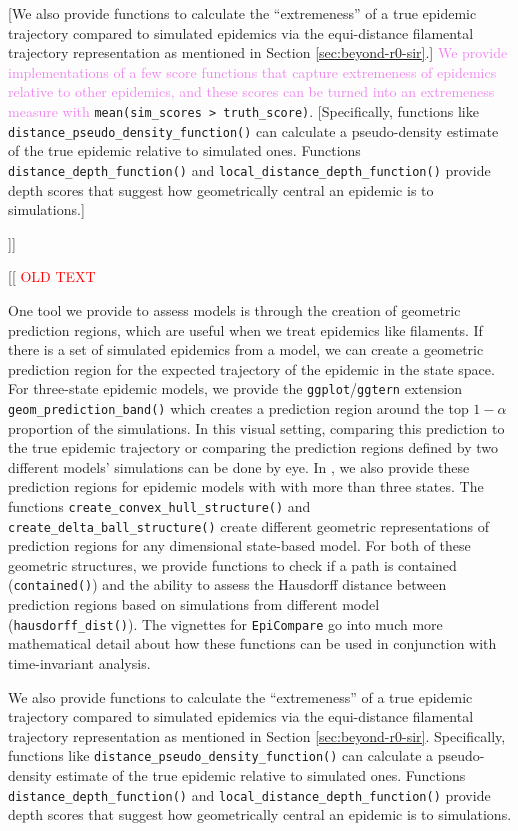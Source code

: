 \documentclass[
  shortnames]{jss}
\begin{document}
{[}We also provide functions to calculate the ``extremeness'' of a true
epidemic trajectory compared to simulated epidemics via the
equi-distance filamental trajectory representation as mentioned in
Section \ref{sec:beyond-r0-sir}.{]}
\textcolor{violet}{We provide implementations of a few score functions that capture extremeness of epidemics relative to other epidemics, and these scores can be turned into an extremeness measure with}
\texttt{mean(sim\_scores\ \textgreater{}\ truth\_score)}.
{[}Specifically, functions like
\texttt{distance\_pseudo\_density\_function()} can calculate a
pseudo-density estimate of the true epidemic relative to simulated ones.
Functions \texttt{distance\_depth\_function()} and
\texttt{local\_distance\_depth\_function()} provide depth scores that
suggest how geometrically central an epidemic is to simulations.{]}

{]}{]}

{[}{[}\textcolor{red}{ OLD TEXT}

One tool we provide to assess models is through the creation of
geometric prediction regions, which are useful when we treat epidemics
like filaments. If there is a set of simulated epidemics from a model,
we can create a geometric prediction region for the expected trajectory
of the epidemic in the state space. For three-state epidemic models, we
provide the \texttt{ggplot}/\texttt{ggtern} extension
\texttt{geom\_prediction\_band()} which creates a prediction region
around the top \(1-\alpha\) proportion of the simulations. In this
visual setting, comparing this prediction to the true epidemic
trajectory or comparing the prediction regions defined by two different
models' simulations can be done by eye. In , we also
provide these prediction regions for epidemic models with with more than
three states. The functions \texttt{create\_convex\_hull\_structure()}
and \texttt{create\_delta\_ball\_structure()} create different geometric
representations of prediction regions for any dimensional state-based
model. For both of these geometric structures, we provide functions to
check if a path is contained (\texttt{contained()}) and the ability to
assess the Hausdorff distance between prediction regions based on
simulations from different model (\texttt{hausdorff\_dist()}). The
vignettes for \texttt{EpiCompare} go into much more mathematical detail
about how these functions can be used in conjunction with time-invariant
analysis.

We also provide functions to calculate the ``extremeness'' of a true
epidemic trajectory compared to simulated epidemics via the
equi-distance filamental trajectory representation as mentioned in
Section \ref{sec:beyond-r0-sir}. Specifically, functions like
\texttt{distance\_pseudo\_density\_function()} can calculate a
pseudo-density estimate of the true epidemic relative to simulated ones.
Functions \texttt{distance\_depth\_function()} and
\texttt{local\_distance\_depth\_function()} provide depth scores that
suggest how geometrically central an epidemic is to simulations.
\end{document}

